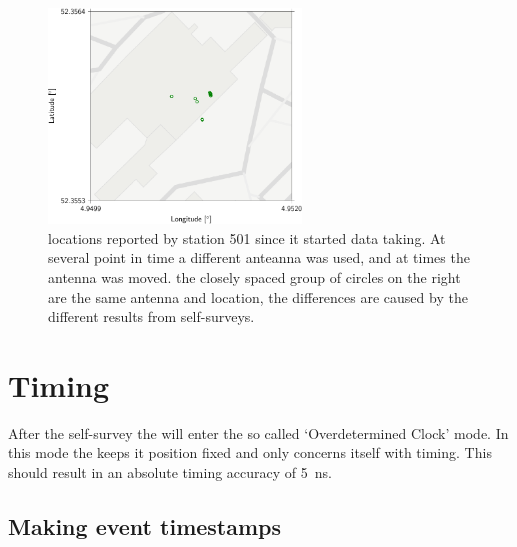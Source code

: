 \begin{figure}
    \centering
    \includegraphics[width=0.6\textwidth]
                    {plots/cluster/4d_station_501_gps}
    \caption{\gps locations reported by station 501 since it started data taking. At several point in time a different \gps anteanna was used, and at times the antenna was moved. the closely spaced group of circles on the right are the same \gps antenna and location, the differences are caused by the different results from self-surveys.}
    \label{fig:4d_station_501_gps}
\end{figure}

%


\section{Timing}

After the self-survey the \gps will enter the so called `Overdetermined Clock' mode. In this mode the \gps keeps it position fixed and only concerns itself with timing. This should result in an absolute timing accuracy of \SI{5}{\ns}.


\subsection{Making event timestamps}
\label{sub:gps_timestamps}

